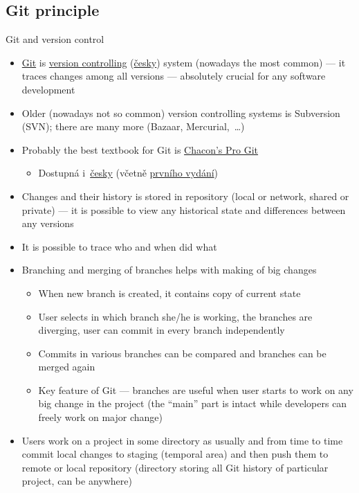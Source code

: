 \documentclass[compress, xelatex, 11pt, xcolor=svgnames, aspectratio=169,
	hyperref={
		bookmarks=true,
		unicode=true,
		colorlinks=true,
		pdftitle={Linux, command line and MetaCentrum},
		plainpages=false,
		pdfauthor={Vojtech Zeisek},
		pdfsubject={Course about use of Linux command line, writing shell scripts and using MetaCentrum of CESNET},
		pdfcreator={XeLaTeX},
		pdfkeywords={Linux, GNU, BASH, shell, command line, MetaCentrum},
		linkcolor=DarkRed, %
		anchorcolor=DarkBlue, %
		citecolor=Indigo, %
		filecolor=NavyBlue, %
		menucolor=DarkMagenta, %
		urlcolor=DarkBlue, %
		},
	url={hyphens, lowtilde} %
	]{beamer}
\begin{document}
\subsection{Git principle}

\begin{frame}[allowframebreaks]{Git and version control}
	\begin{itemize}
		\item \href{https://git-scm.com/}{Git} is \href{https://en.wikipedia.org/wiki/Version_control}{version controlling} (\href{https://cs.wikipedia.org/wiki/Verzov\%C3\%A1n\%C3\%AD}{česky}) system (nowadays the most common) --- it traces changes among all versions --- absolutely crucial for any software development
		\item Older (nowadays not so common) version controlling systems is Subversion (SVN); there are many more (Bazaar, Mercurial,~\ldots)
		\item Probably the best textbook for Git is \href{https://git-scm.com/book/en/v2}{Chacon's Pro Git}
		\begin{itemize}
			\item Dostupná i~\href{https://git-scm.com/book/cs/v2}{česky} (včetně \href{https://knihy.nic.cz/\#ProGit}{prvního vydání})
		\end{itemize}
		\item Changes and their history is stored in repository (local or network, shared or private) --- it is possible to view any historical state and differences between any versions
		\item It is possible to trace who and when did what
		\item Branching and merging of branches helps with making of big changes
		\begin{itemize}
			\item When new branch is created, it contains copy of current state
			\item User selects in which branch she/he is working, the branches are diverging, user can commit in every branch independently
			\item Commits in various branches can be compared and branches can be merged again
			\item Key feature of Git --- branches are useful when user starts to work on any big change in the project (the \enquote{main} part is intact while developers can freely work on major change)
		\end{itemize}
		\item Users work on a project in some directory as usually and from time to time commit local changes to staging (temporal area) and then push them to remote or local repository (directory storing all Git history of particular project, can be anywhere)

\end{itemize}
\end{frame}
\end{document}
